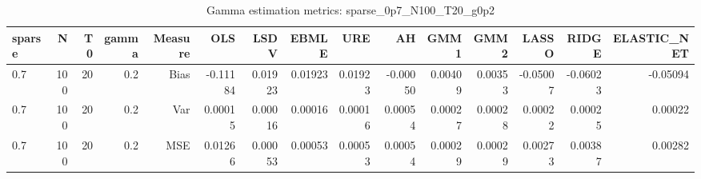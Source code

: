 \begin{table}[!htbp]\centering
\caption{Gamma estimation metrics: sparse_0p7_N100_T20_g0p2}
\label{tab:table1_sparse_0p7_N100_T20_g0p2}
\begin{tabular}{lrrrrrrrrrrrrrr}
\hline
sparse & N & T0 & gamma & Measure & OLS & LSDV & EBMLE & URE & AH & GMM1 & GMM2 & LASSO & RIDGE & ELASTIC_NET \\
\hline
0.7 & 100 & 20 & 0.2 & Bias & -0.11184 & 0.01923 & 0.01923 & 0.01923 & -0.00050 & 0.00409 & 0.00353 & -0.05007 & -0.06023 & -0.05094 \\
0.7 & 100 & 20 & 0.2 & Var & 0.00015 & 0.00016 & 0.00016 & 0.00016 & 0.00054 & 0.00027 & 0.00028 & 0.00022 & 0.00025 & 0.00022 \\
0.7 & 100 & 20 & 0.2 & MSE & 0.01266 & 0.00053 & 0.00053 & 0.00053 & 0.00054 & 0.00029 & 0.00029 & 0.00273 & 0.00387 & 0.00282 \\
\hline
\end{tabular}
\end{table}

